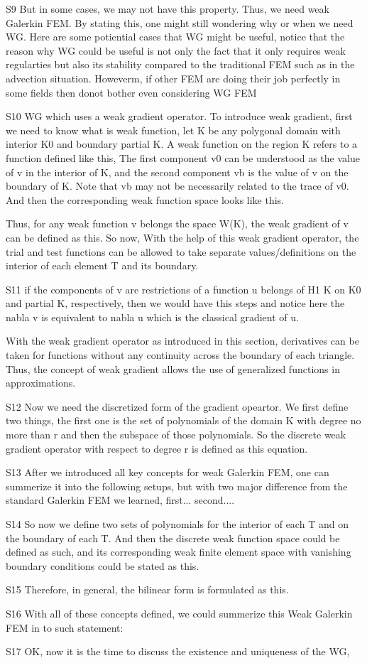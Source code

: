 \documentclass[17pt]{extarticle} %
\begin{document}
S9
But in some cases, we may not have this property. Thus, we need weak Galerkin FEM. By stating this, one might still
wondering why or when we need WG.  
Here are some potiential cases that WG might be useful, notice that the reason why WG could be useful is not only 
the fact that it only requires weak regularties but also its stability compared to the traditional FEM such as in the advection
situation. Howeverm, if other FEM are doing their job perfectly in some fields then donot bother even considering WG FEM

S10
WG which uses a weak gradient operator. To introduce weak gradient, first we need to know what is weak function, 
let K be any polygonal domain with interior K0 and boundary partial K. A weak function on the
region K refers to a function defined like this, The first component v0 can be understood
as the value of v in the interior of K, and the second component vb is the value of v on the boundary of K. Note that vb may
not be necessarily related to the trace of v0. And then the corresponding weak function space looks
like this.

Thus, for any weak function v belongs the space W(K), the weak gradient of v can be defined as this.
So now, With the help of this weak gradient operator, the trial and test functions can be allowed to take 
separate values/definitions on the interior of each element T and its boundary.

S11
if the components of v are restrictions of a function u belongs of H1 K on K0 and partial K, respectively, then we would have this steps and notice here the nabla v is equivalent
to nabla u which is the classical gradient of u.

With the weak gradient operator as introduced in this section, derivatives can be taken for functions without any continuity across the
boundary of each triangle. Thus, the concept of weak gradient allows the use of generalized functions in approximations.

S12
Now we need the discretized form of the gradient opeartor. We first define two things, the first one is 
the set of polynomials of the domain K with degree no more than r and then the subspace of those polynomials.
So the discrete weak gradient operator with respect to degree r is defined as this equation. 

S13
After we introduced all key concepts for weak Galerkin FEM, one can summerize it into the following setups,
but with two major difference from the standard Galerkin FEM we learned, first...
second....

S14
So now we define two sets of polynomials for the interior of each T and on the boundary of each T.
And then the discrete weak function space could be defined as such, and its corresponding weak finite element
space with vanishing boundary conditions could be stated as this. 

S15
Therefore, in general, the bilinear form is formulated as this. 

S16
With all of these concepts defined, we could summerize this Weak Galerkin FEM in to such statement:

S17
OK, now it is the time to discuss the existence and uniqueness of the WG, 
\end{document}
